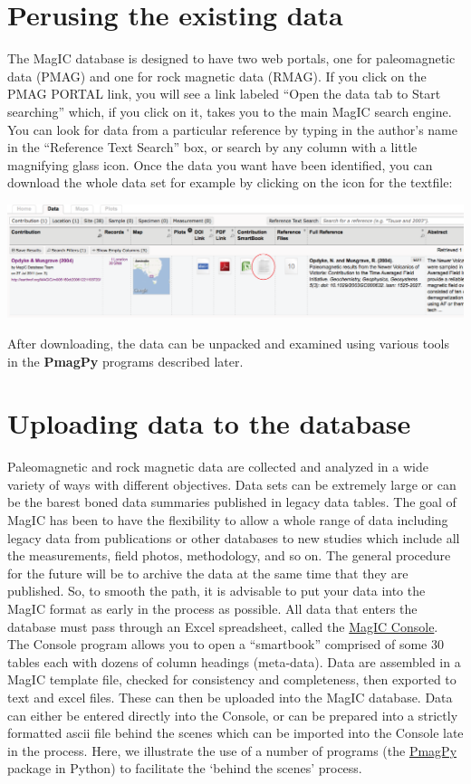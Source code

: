 \documentclass[11pt]{book}
\begin{document}
{\section {Perusing the existing data}

The MagIC database is designed to have two web portals, one for paleomagnetic data (PMAG) and one for rock magnetic data (RMAG).  If you click on the PMAG PORTAL link,  you will see a link labeled ``Open the data tab to Start searching'' which, if you click on it, takes you to the main MagIC search engine.  You can look for data from a particular reference by typing in the author's name in the ``Reference Text Search'' box, or search by any column with a little magnifying glass icon.   
  Once the data you want have been identified, you can download the whole data set for example by clicking on the
  icon for the textfile:
  
    \includegraphics[width=15cm]{EPSfiles/MagIC_search.eps}
  
  
       After downloading, the data can be unpacked and examined using various tools in the {\bf PmagPy}  programs described later.   

\section{Uploading data to the database}

Paleomagnetic and rock magnetic data are collected and analyzed in a wide variety of ways with different objectives.  Data sets can be extremely large or can be the barest boned data summaries published in legacy data tables.   The goal of MagIC has been to have the flexibility to allow a whole range of data including legacy data from publications or other databases to new studies which include all the measurements, field photos, methodology, and so on.  The general procedure for the future will be to archive the data at the same time that they are published.    So, to smooth the path, it is advisable to put your data into the MagIC format as early in the process as possible.  All data that enters the database must pass through    an Excel spreadsheet, called the \href{http://earthref.org/MAGIC/software.htm}{MagIC Console}.  The Console program allows you to open a ``smartbook''  comprised of  some 30 tables each with dozens of column headings (meta-data).      Data are assembled in  a MagIC template file, checked for consistency and completeness, then exported to text and excel files.  These can then be uploaded into the MagIC database.   Data can either be entered directly into the Console, or can be prepared into a strictly formatted ascii file behind the scenes which can be imported into the Console late in the process. Here,  we illustrate the use of  a number of programs (the \href{#PmagPy}{PmagPy}  package in Python) to facilitate the `behind the scenes' process.      

}
\end{document}
